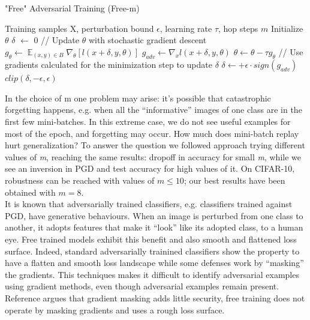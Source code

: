 \documentclass{article}
\DeclareMathOperator{\EX}{\mathbb{E}}%
\begin{document}
\begin{algorithm}[H]
	\caption{"Free" Adversarial Training (Free-m)}
	\begin{algorithmic}[1]
		\Require Training samples X, perturbation bound $\epsilon$, learning rate $\tau$, hop steps $m$
		\State Initialize $\theta$
		\State $\delta$ $\leftarrow$ 0
		\State // Update $\theta$ with stochastic gradient descent
		\State $g_{\theta} \leftarrow \EX_{(x,y) \in B} \nabla_{\theta} [l(x+\delta, y, \theta)]$
		\State $g_{adv} \leftarrow \nabla_{x} l(x+\delta, y, \theta)$
		\State $\theta \leftarrow \theta - \tau g_{\theta}$
		\State // Use gradients calculated for the minimization step to update $\delta$
		\State $\delta \leftarrow + \epsilon \cdot sign(g_{adv})$
		\State $clip(\delta, -\epsilon, \epsilon)$
		\EndFor
		\EndFor
		\EndFor
	\end{algorithmic}
\end{algorithm}
In the choice of m one problem may arise:
it's possible that catastrophic forgetting happens, e.g. when all the “informative” images of one class are in the first few mini-batches. In this extreme case, we do not see useful examples for most of the epoch, and forgetting may occur.
How much does mini-batch replay hurt generalization?
To answer the question we followed \cite{ShafahiEtAl2019b} approach trying different values of \textit{m}, reaching the same results: dropoff in accuracy for small \textit{m}, while we see an inversion in PGD and test accuracy for high values of it. On CIFAR-10, robustness can be reached with values of $m \leq 10$; our best results have been obtained with $m = 8$.\\
It is known that adversarially trained classifiers, e.g. classifiers trained against PGD,  have generative behaviours. When an image is perturbed from one class to another, it adopts features that make it “look” like its adopted class, to a human eye.
Free trained models exhibit this benefit and also smooth and flattened loss surface.
Indeed, standard adversarially trainined classifiers show the property to have a flatten and smooth loss landscape while some defenses work by “masking” the gradients. This techniques makes it difficult to identify
adversarial examples using gradient methods, even though adversarial examples remain present.
Reference \cite{EngstromEtAl2018} argues that gradient masking adds little security, free training does not operate by masking gradients and uses a rough loss surface.
\end{document}
